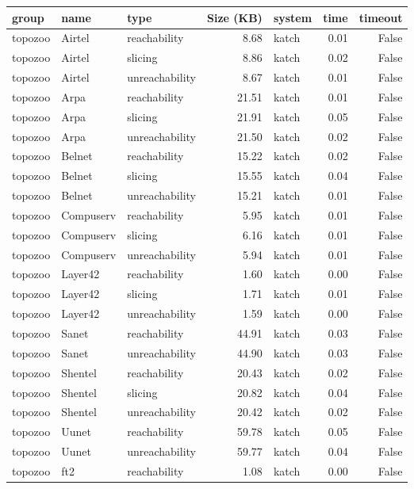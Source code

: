 \begin{tabular}{lllrlrr}
\toprule
group & name & type & Size (KB) & system & time & timeout \\
\midrule
topozoo & Airtel & reachability & 8.68 & katch & 0.01 & False \\
topozoo & Airtel & slicing & 8.86 & katch & 0.02 & False \\
topozoo & Airtel & unreachability & 8.67 & katch & 0.01 & False \\
topozoo & Arpa & reachability & 21.51 & katch & 0.01 & False \\
topozoo & Arpa & slicing & 21.91 & katch & 0.05 & False \\
topozoo & Arpa & unreachability & 21.50 & katch & 0.02 & False \\
topozoo & Belnet & reachability & 15.22 & katch & 0.02 & False \\
topozoo & Belnet & slicing & 15.55 & katch & 0.04 & False \\
topozoo & Belnet & unreachability & 15.21 & katch & 0.01 & False \\
topozoo & Compuserv & reachability & 5.95 & katch & 0.01 & False \\
topozoo & Compuserv & slicing & 6.16 & katch & 0.01 & False \\
topozoo & Compuserv & unreachability & 5.94 & katch & 0.01 & False \\
topozoo & Layer42 & reachability & 1.60 & katch & 0.00 & False \\
topozoo & Layer42 & slicing & 1.71 & katch & 0.01 & False \\
topozoo & Layer42 & unreachability & 1.59 & katch & 0.00 & False \\
topozoo & Sanet & reachability & 44.91 & katch & 0.03 & False \\
topozoo & Sanet & unreachability & 44.90 & katch & 0.03 & False \\
topozoo & Shentel & reachability & 20.43 & katch & 0.02 & False \\
topozoo & Shentel & slicing & 20.82 & katch & 0.04 & False \\
topozoo & Shentel & unreachability & 20.42 & katch & 0.02 & False \\
topozoo & Uunet & reachability & 59.78 & katch & 0.05 & False \\
topozoo & Uunet & unreachability & 59.77 & katch & 0.04 & False \\
topozoo & ft2 & reachability & 1.08 & katch & 0.00 & False \\

\end{tabular}
